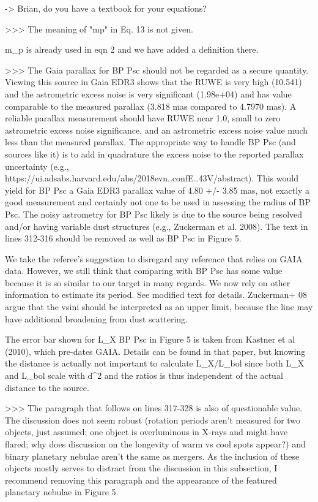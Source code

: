 -> Brian, do you have a textbook for your equations?

>>> The meaning of "mp" in Eq. 13 is not given.

m_p is already used in eqn 2 and we have added a definition there.

>>> The Gaia parallax for BP Psc should not be regarded as a secure quantity. Viewing this source in Gaia EDR3 shows that the RUWE is very high (10.541) and the astrometric excess noise is very significant (1.98e+04) and has value comparable to the measured parallax (3.818 mas compared to 4.7970 mas). A reliable parallax measurement should have RUWE near 1.0, small to zero astrometric excess noise significance, and an astrometric excess noise value much less than the measured parallax. The appropriate way to handle BP Psc (and sources like it) is to add in quadrature the excess noise to the reported parallax uncertainty (e.g., https://ui.adsabs.harvard.edu/abs/2018evn..confE..43V/abstract). This would yield for BP Psc a Gaia EDR3 parallax value of 4.80 +/- 3.85 mas, not exactly a good measurement and certainly not one to be used in assessing the radius of BP Psc. The noisy astrometry for BP Psc likely is due to the source being resolved and/or having variable dust structures (e.g., Zuckerman et al. 2008). The text in lines 312-316 should be removed as well as BP Psc in Figure 5.

We take the referee's suggestion to disregard any reference that relies on GAIA data. However, we still think that comparing with BP Psc has some value because it is so similar to our target in many regards.  We now rely on other information to estimate its period. See modified text for details.
Zuckerman+ 08 argue that the vsini should be interpreted as an upper limit, because the line may have additional broadening from dust scattering.

The error bar shown for L_X BP Psc in Figure 5 is taken from Kastner et al (2010), which pre-dates GAIA. Details can be found in that paper, but knowing the distance is actually not important to calculate L_X/L_bol since both L_X and L_bol scale with d^2 and the ratios is thus independent of the actual distance to the source. 



>>> The paragraph that follows on lines 317-328 is also of questionable value. The discussion does not seem robust (rotation periods aren't measured for two objects, just assumed; one object is overluminous in X-rays and might have flared; why does discussion on the longevity of warm vs cool spots appear?) and binary planetary nebulae aren't the same as mergers. As the inclusion of these objects mostly serves to distract from the discussion in this subsection, I recommend removing this paragraph and the appearance of the featured planetary nebulae in Figure 5.


